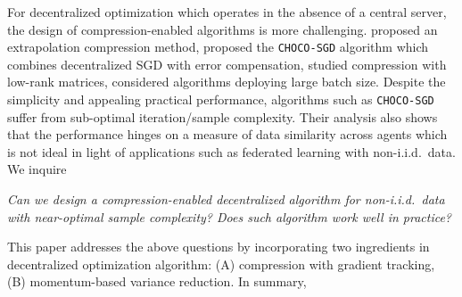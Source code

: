 \documentclass[10pt]{article} %
\newcommand{\revision}{}
\theoremstyle{plain}
\theoremstyle{definition}
\theoremstyle{remark}
\begin{document}
For decentralized optimization which operates in the absence of a central server, the design of compression-enabled algorithms is more challenging. \citet{tang2018communication} proposed an extrapolation compression method, \citet{koloskova2019decentralized, koloskova2019decentralizeda} proposed the {\tt CHOCO-SGD} algorithm which combines decentralized SGD \citep{lian2017can} with error compensation, \citet{vogels2020practical} studied compression with low-rank matrices, \citet{zhao2022beer} considered algorithms deploying large batch size. 
Despite the simplicity and appealing practical performance, algorithms such as {\tt CHOCO-SGD} suffer from sub-optimal iteration/sample complexity. Their analysis also shows that the performance hinges on a measure of data similarity across agents which is not ideal in light of applications such as federated learning with non-i.i.d.~data. We inquire\vspace{-.2cm}
\begin{samepage}\begin{center}
    \emph{Can we design a compression-enabled decentralized algorithm for non-i.i.d.~data with near-optimal {\revision sample} complexity? Does such algorithm work well in practice?} \vspace{-.2cm} 
\end{center}\end{samepage}
This paper addresses the above questions by incorporating two ingredients in decentralized optimization algorithm: {\sf (A)} compression with gradient tracking, {\sf (B)} momentum-based variance reduction. In summary,\vspace{-.0cm}
\end{document}
